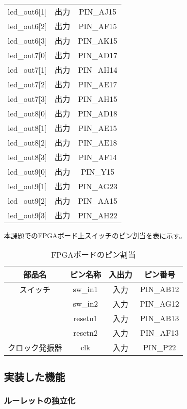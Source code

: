 \documentclass{ltjsarticle}
\begin{document}
\begin{table}[H]
\begin{center}
\begin{tabular}{cc|c}
			led\_out6[1]&出力&PIN\_AJ15\\
			led\_out6[2]&出力&PIN\_AF15\\
			led\_out6[3]&出力&PIN\_AK15\\
			led\_out7[0]&出力&PIN\_AD17\\
			led\_out7[1]&出力&PIN\_AH14\\
			led\_out7[2]&出力&PIN\_AE17\\
			led\_out7[3]&出力&PIN\_AH15\\
			led\_out8[0]&出力&PIN\_AD18\\
			led\_out8[1]&出力&PIN\_AE15\\
			led\_out8[2]&出力&PIN\_AE18\\
			led\_out8[3]&出力&PIN\_AF14\\
			led\_out9[0]&出力&PIN\_Y15\\
			led\_out9[1]&出力&PIN\_AG23\\
			led\_out9[2]&出力&PIN\_AA15\\
			led\_out9[3]&出力&PIN\_AH22\\ \hline
		\end{tabular}
		\end{center}
		\end{table}

	本課題でのFPGAボード上スイッチのピン割当を表に示す。
		\begin{table}[H]
		\begin{center}
		\caption{FPGAボードのピン割当}
		\label{tab:SWpin}
		\begin{tabular}{c|cc|c} \toprule
			部品名&ピン名称&入出力&ピン番号\\ \hline
			スイッチ&sw\_in1&入力&PIN\_AB12\\
			&sw\_in2&入力&PIN\_AG12\\
			&resetn1&入力&PIN\_AB13\\
			&resetn2&入力&PIN\_AF13\\ \hline
			クロック発振器&clk&入力&PIN\_P22\\
		\bottomrule
		\end{tabular}
		\end{center}
		\end{table}
	\subsection{実装した機能}
		\subsubsection{ルーレットの独立化}
\end{document}
